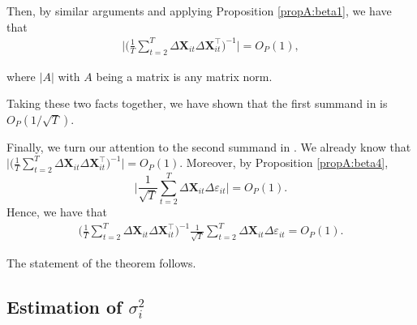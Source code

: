 \documentclass[a4paper,12pt]{article}
\makeatletter
\renewcommand{\eqref}[1]{\tagform@{\ref{#1}}}
\makeatother
\begin{document}
Then, by similar arguments and applying Proposition \ref{propA:beta1}, we have that
\begin{align*}
\Bigg|  \Big(\frac{1}{T}\sum_{t=2}^T\Delta \mathbf{X}_{it} \Delta \mathbf{X}_{it}^\top\Big)^{-1}\Bigg| = O_P(1),
\end{align*}

where $|A|$ with $A$ being a matrix is any matrix norm.

Taking these two facts together, we have shown that the first summand in \eqref{eq:theo:beta} is $O_P(1/\sqrt{T})$.

Finally, we turn our attention to the second summand in \eqref{eq:theo:beta}. We already know that $\Big|  \big(\frac{1}{T}\sum_{t=2}^T\Delta \mathbf{X}_{it} \Delta \mathbf{X}_{it}^\top\big)^{-1}\Big| = O_P(1)$. Moreover, by Proposition \ref{propA:beta4}, 
\[ \bigg| \frac{1}{\sqrt{T}}\sum_{t=2}^T \Delta \mathbf{X}_{it}\Delta \varepsilon_{it} \bigg| = O_P(1).
\]
Hence, we have that 
\begin{align}\label{theo:beta:proof8}
\Big(\frac{1}{T} \sum_{t=2}^T \Delta \mathbf{X}_{it} \Delta \mathbf{X}_{it}^\top \Big)^{-1}\frac{1}{\sqrt{T}} \sum_{t=2}^T \Delta \mathbf{X}_{it} \Delta \varepsilon_{it} = O_P(1).
\end{align}

The statement of the theorem follows.





\subsection{Estimation of  $\sigma^2_i$}\label{subsec:para:lrv}
\end{document}

